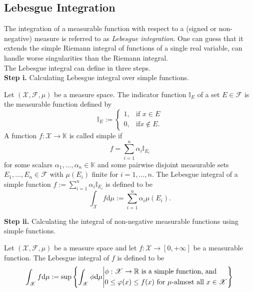 \subsection{Lebesgue Integration}
The integration of a measurable function with respect to a (signed or non-negative) measure is referred to as \textit{Lebesgue integration}. One can guess that it extends the simple Riemann integral of functions of a single real variable, can handle worse singularities than the Riemann integral.\\
The Lebesgue integral can define in three steps.\\
\textbf{Step i.} Calculating Lebesgue integral over simple functions.
\begin{defn}
	Let $(\mathscr{X}, \mathscr{F}, \mu)$ be a measure space. The indicator function $\mathbb{I}_E$ of a set
$E \in \mathscr{F}$ is the measurable function defined by
	\begin{equation*}
		\mathbb{I}_E := 
		\begin{cases}
		1,& \text{if } x \in E\\
		0,& \text{if} x \notin E.
		\end{cases}
	\end{equation*}
	A function $f : \mathscr{X} \to \mathbb{K}$ is called simple if
	\begin{equation*}
		f = \sum_{i=1}^{n} \alpha_i \mathbb{I}_{E_{i}}
	\end{equation*}
	for some scalars $\alpha_1, \dots ,\alpha_n \in \mathbb{K}$ and some pairwise disjoint measurable sets $E_1, \dots, E_n \in \mathscr{F}$
with $\mu(E_i)$ finite for $i = 1, \dots, n$. The Lebesgue integral of a simple function $f := \sum_{i=1}^{n} \alpha_i \mathbb{I}_{E_{i}}
$ is defined to be
	\begin{equation*}
		\int_{\mathscr{X}} f \text{d}\mu := \sum_{i=1}^{n} \alpha_i \mu(E_i).
	\end{equation*}
\end{defn}
\textbf{Step ii.} Calculating the integral of non-negative measurable functions using simple functions.
\begin{defn}
	Let $(\mathscr{X}, \mathscr{F}, \mu)$ be a measure space and let $f :  \mathscr{X} \to [0, + \infty]$ be a measurable
function. The Lebesgue integral of $f$ is defined to be
	\begin{equation*}
	\int_{\mathscr{X}} f \text{d}\mu := \sup \left\{ \int_{\mathscr{X}}\phi \text{d}\mu \middle\vert 
	\begin{aligned}
		& \phi : \mathscr{X} \to \mathbb{R} \text{ is a simple function, and} \\
		& 0 \leq \varphi(x) \leq f(x) \text{ for } \mu\text{-almost all } x \in \mathscr{X}
	\end{aligned}
	  \right \} \\
	\end{equation*}
\end{defn} 
